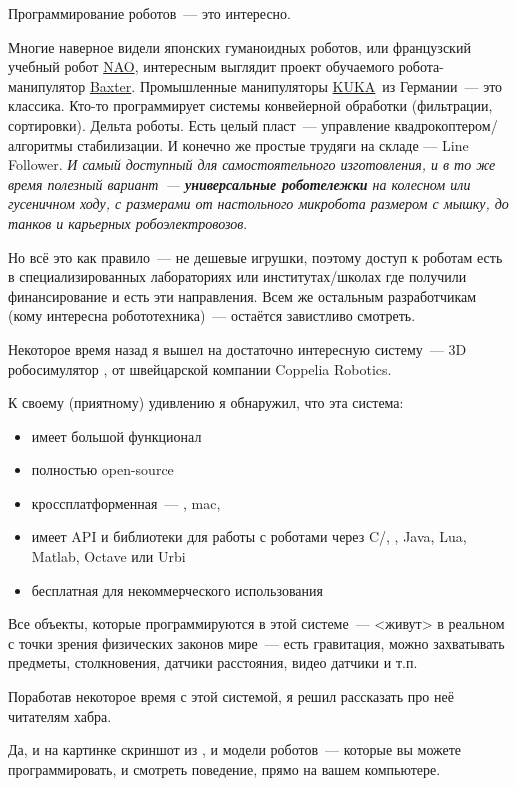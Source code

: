 \label{intro}


Программирование роботов\ --- это интересно.

Многие наверное видели японских гуманоидных роботов, или французский учебный
робот \href{https://en.wikipedia.org/wiki/Nao_(robot)}{NAO}, 
интересным выглядит проект обучаемого робота-манипулятор 
\href{http://www.rethinkrobotics.com/baxter/}{Baxter}. 
Промышленные манипуляторы 
\href{http://www.kuka-robotics.com/russia/ru/}{KUKA}\ из Германии\ --- это 
классика. Кто-то программирует системы конвейерной обработки (фильтрации, 
сортировки). Дельта роботы. Есть целый пласт\ --- управление 
квадрокоптером/алгоритмы стабилизации. И конечно же 
простые трудяги на складе — Line Follower. \textit{И самый доступный для 
самостоятельного изготовления, и в то же время полезный 
вариант\ --- \textbf{\emph{универсальные
роботележки}} на колесном или гусеничном ходу, с размерами от настольного
микробота размером с мышку, до танков и карьерных робоэлектровозов}.

\noindent
{}
\bigskip

Но всё это как правило\ --- не дешевые игрушки, поэтому доступ к роботам есть в
специализированных лабораториях или институтах/школах где получили 
финансирование и есть эти направления. Всем же остальным разработчикам (кому
интересна робототехника)\ --- остаётся завистливо смотреть.

Некоторое время назад я вышел на достаточно интересную систему\ --- 3D
робосимулятор \vrep, от швейцарской компании Coppelia Robotics.

К своему (приятному) удивлению я обнаружил, что эта система:
\begin{itemize}[nosep]
\item имеет большой функционал
\item полностью open-source
\item кроссплатформенная\ --- \win, mac, \lin{}
\item имеет API и библиотеки для работы с роботами через 
	C/\cpp, \py, Java, Lua, Matlab, Octave или Urbi
\item бесплатная для некоммерческого использования
\end{itemize}

Все объекты, которые программируются в этой системе\ --- <живут> в реальном с 
точки зрения физических законов мире\ --- есть гравитация, можно захватывать 
предметы, столкновения, датчики расстояния, видео датчики и т.п.

Поработав некоторое время с этой системой, я решил рассказать про неё 
читателям хабра.

Да, и на картинке скриншот из \vrep, и модели роботов\ --- которые вы можете 
программировать, и смотреть поведение, прямо на вашем компьютере.

